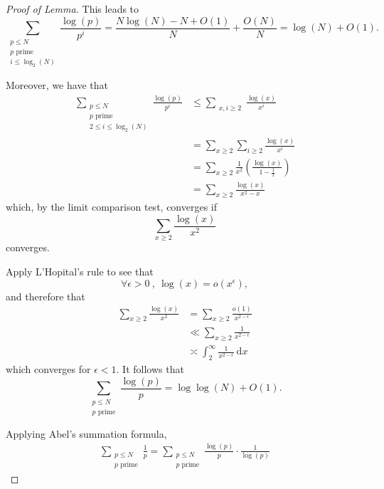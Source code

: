 \documentclass[12pt]{amsart}
\begin{document}
\begin{proof}[Proof of Lemma]
This leads to
\[
    \sum _{\substack{ p \leq N \\ p \text{ prime} \\ i \leq \log _{2} \left( N \right) }} \frac{\log \left( p \right) }{p ^{i}} = \frac{N \log \left( N \right) - N + O(1)}{N} + \frac{O(N)}{N} = \log \left( N \right)  + O(1)
.\]

Moreover, we have that
\begin{align*}
\sum  _{\substack{ p \leq N \\ p \text{ prime} \\ 2 \leq i \leq \log _{2} \left( N \right)  }} \frac{\log \left( p \right) }{p ^{i}} & \leq \sum  _{\substack{ x,i \geq 2}} \frac{\log \left( x \right) }{x ^{i}} \\
& = \sum _{x \geq 2} \sum _{i \geq 2} \frac{\log \left( x \right) }{x^{i}} \\
& = \sum _{x \geq 2} \frac{1}{x^{2}} \left( \frac{\log \left( x \right) }{1-\frac{1}{x} }  \right)\\
& = \sum _{x \geq 2} \frac{\log \left( x \right) }{x ^{2} - x} 
\end{align*}
which, by the limit comparison test, converges if
\[
    \sum _{x \geq 2} \frac{\log \left( x \right) }{x^{2}}
\]
converges.

Apply L'Hopital's rule to see that
\[
    \forall \epsilon > 0 ~,~ \log \left( x \right) = o(x^{\epsilon})
,\]
and therefore that
\begin{align*}
\sum _{x \geq 2} \frac{\log \left( x \right)}{x ^{2}} & = \sum _{x\geq 2} \frac{o(1)}{x^{2 - \epsilon}} \\
& \ll \sum _{x \geq 2} \frac{1}{x^{2-\epsilon}} \\
& \asymp \int_{2}^{\infty} \frac{1}{x^{2-\epsilon}}  ~\mathrm{d} x 
\end{align*}
which converges for \(\epsilon < 1\). It follows that
\[
    \sum _{\substack{ p \leq N \\p \text{ prime}  }}\frac{ \log \left( p \right) }{p} = \log\log \left( N \right) + O(1)
.\]

Applying Abel's summation formula,
\begin{align*}
\sum  _{\substack{ p \leq N \\p \text{ prime}  }} \frac{1}{p} = \sum _{\substack{ p \leq N \\ p \text{ prime}  }}   \frac{\log \left( p \right) }{p} \cdot \frac{1}{\log \left( p \right) } 
\end{align*}




\end{proof}
\end{document}
